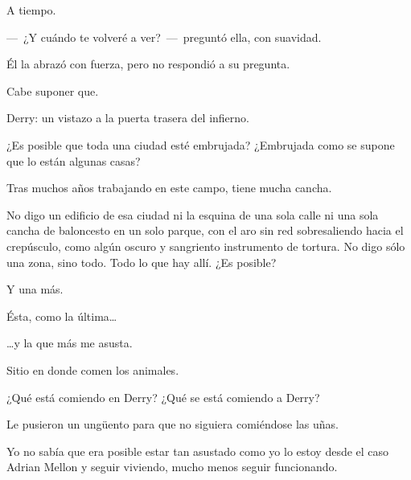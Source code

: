 \sk
A tiempo. 

\sk
---~¿Y cuándo te volveré a ver?~---~preguntó ella,
con suavidad.

\sk
Él la abrazó con fuerza, pero no respondió a su
pregunta.

\sk
Cabe suponer que. 

\sk
Derry: un vistazo a la puerta trasera del infierno.

\sk
¿Es posible que toda una ciudad esté embrujada?
¿Embrujada como se supone que lo están
algunas casas?

\sk
Tras muchos años trabajando en este campo, tiene mucha cancha. 

\sk
No digo un edificio de esa ciudad ni la esquina
de una sola calle ni una sola cancha de baloncesto
en un solo parque, con el aro sin red
sobresaliendo hacia el crepúsculo, como algún
oscuro y sangriento instrumento de tortura. No
digo sólo una zona, sino todo. Todo lo que hay
allí.
¿Es posible?

\sk
Y una más. 

\sk
Ésta, como la última\ldots{} 

\sk
\ldots{}y la que más me asusta. 

\sk
Sitio en donde comen los animales. 

\sk
¿Qué está comiendo en Derry? ¿Qué se está
comiendo a Derry?

\sk
Le pusieron un ungüento para que no siguiera comiéndose las uñas. 

\sk
Yo no sabía que era
posible estar tan asustado como yo lo estoy desde
el caso Adrian Mellon y seguir viviendo, mucho
menos seguir funcionando.

